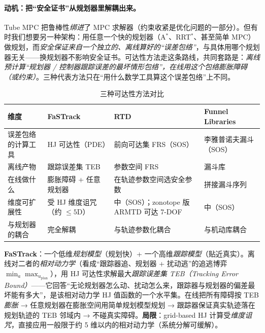\paragraph{动机：把“安全证书”从规划器里解耦出来。}
Tube MPC 把鲁棒性\emph{绑进}了 MPC 求解器（约束收紧是优化问题的一部分）。但有时我们想要另一种架构：用任意一个快的规划器（A$^*$、RRT$^*$、甚至简单 MPC）做规划，而\emph{安全保证来自一个独立的、离线算好的“误差包络”}，与具体用哪个规划器无关——换规划器不影响安全证书。可达性方法走这条路线，共同套路是：\emph{离线预计算“规划器 / 控制器跟踪误差的最坏情形包络”，在线用这个包络膨胀障碍（或约束）}。三种代表方法只在“用什么数学工具算这个误差包络”上不同。

\begin{table}[H]\centering\small
\caption{三种可达性方法对比}
\label{tab:pr-reach}
\begin{tabular}{p{} p{} p{} p{}}
\toprule
维度 & FaSTrack & RTD & Funnel Libraries \\
\midrule
误差包络的计算工具 & HJ 可达性（PDE） & 前向可达集 FRS（SOS） & 李雅普诺夫漏斗（SOS） \\
离线产物 & 跟踪误差集 TEB & 参数空间 FRS & 漏斗库 \\
在线做什么 & 膨胀障碍 + 任意规划器 & 在轨迹参数空间选安全参数 & 拼接漏斗序列 \\
维度可扩展性 & 受 HJ 维度诅咒（约 $\le 5$D） & 中（SOS）；zonotope 版 ARMTD 可达 7-DOF & 中（SOS） \\
与规划器的耦合 & 完全解耦 & 与轨迹参数化耦合 & 与机动库耦合 \\
\bottomrule
\end{tabular}
\end{table}

\textbf{FaSTrack}\cite{herbert2017fastrack}：一个低维\emph{规划模型}（规划快）+ 一个高维\emph{跟踪模型}（贴近真实）。离线对二者的\emph{相对动力学}（看成“跟踪器追、规划器 + 扰动逃”的追逃博弈 $\min_a\max_{u_{\mathrm{plan}}}$），用 HJ 可达性求解最大\emph{跟踪误差集 TEB（Tracking Error Bound）}——它回答“无论规划器怎么动、扰动怎么来，跟踪器与规划器的偏差最坏能有多大”，是该相对动力学 HJ 值函数的一个水平集。在线把所有障碍按 TEB \emph{膨胀} → 任意规划器在膨胀空间用简单规划模型规划 → 跟踪器保证真实轨迹落在规划轨迹的 TEB 邻域内 → 不碰真实障碍。\textbf{局限}：grid-based HJ 计算受\emph{维度诅咒}，直接应用一般限于约 5 维以内的相对动力学（系统分解可缓解）。

